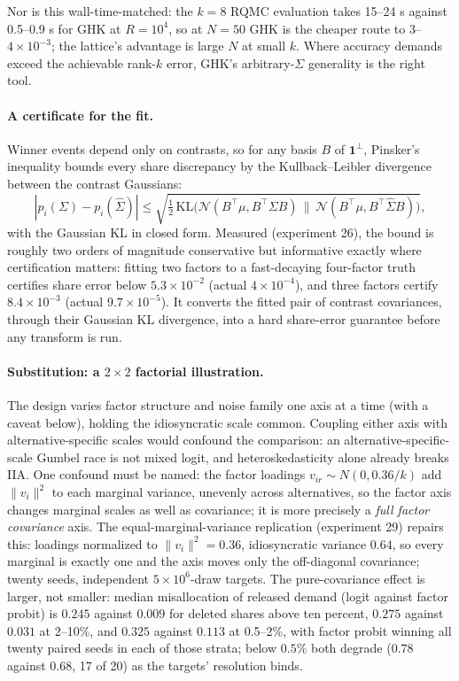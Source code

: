 \documentclass[12pt]{article}
\theoremstyle{remark}
\begin{document}
Nor is this wall-time-matched: the $k=8$ RQMC evaluation takes
15--24 s against 0.5--0.9 s for GHK at $R=10^4$, so at $N=50$ GHK is the
cheaper route to $3$--$4\times10^{-3}$; the lattice's advantage is large
$N$ at small $k$. Where accuracy demands exceed the achievable rank-$k$
error, GHK's arbitrary-$\Sigma$ generality is the right tool.

\paragraph{A certificate for the fit.} Winner events depend only on
contrasts, so for any basis $B$ of $\mathbf{1}^\perp$, Pinsker's
inequality bounds every share discrepancy by the Kullback--Leibler
divergence between the contrast Gaussians:
\[
|p_i(\Sigma) - p_i(\hat\Sigma)| \le
\sqrt{\tfrac12\,\mathrm{KL}\big(\mathcal{N}(B^\top\mu, B^\top\Sigma B)\,\|\,
\mathcal{N}(B^\top\mu, B^\top\hat\Sigma B)\big)},
\]
with the Gaussian KL in closed form. Measured (experiment 26), the bound is roughly two
orders of magnitude conservative but informative exactly where
certification matters: fitting two factors to a fast-decaying
four-factor truth certifies share error below $5.3\times10^{-2}$
(actual $4\times10^{-4}$), and three factors certify
$8.4\times10^{-3}$ (actual $9.7\times10^{-5}$). It converts the fitted pair of contrast covariances, through their
Gaussian KL divergence, into a hard share-error guarantee before any
transform is run.

\paragraph{Substitution: a $2\times2$ factorial illustration.} The design varies factor
structure and noise family one axis at a time (with a caveat below),
holding the idiosyncratic
scale common. Coupling either axis with alternative-specific scales would
confound the comparison: an alternative-specific-scale Gumbel race is not
mixed logit, and heteroskedasticity alone already breaks IIA. One
confound must be named: the factor loadings $v_{ir} \sim N(0, 0.36/k)$
add $\|v_i\|^2$ to each marginal variance, unevenly across
alternatives, so the factor axis changes marginal scales as well as
covariance; it is more precisely a \emph{full factor covariance} axis.
The equal-marginal-variance replication (experiment 29) repairs this:
loadings normalized to $\|v_i\|^2 = 0.36$, idiosyncratic variance
$0.64$, so every marginal is exactly one and the axis moves only the
off-diagonal covariance; twenty seeds, independent $5\times10^6$-draw
targets. The pure-covariance effect is larger, not smaller: median
misallocation of released demand (logit against factor probit) is
$0.245$ against $0.009$ for deleted shares above ten percent,
$0.275$ against $0.031$ at 2--10\%, and $0.325$ against $0.113$ at
0.5--2\%, with factor probit winning all twenty paired seeds in each of
those strata; below $0.5\%$ both degrade ($0.78$ against $0.68$, 17 of
20) as the targets' resolution binds.
\end{document}
